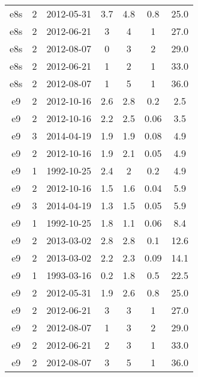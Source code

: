 \begin{table*}[htp]
\begin{tabular}{ccccccc}
e8s & 2 & 2012-05-31 & 3.7 & 4.8 & 0.8 & 25.0 \\
e8s & 2 & 2012-06-21 & 3 & 4 & 1 & 27.0 \\
e8s & 2 & 2012-08-07 & 0 & 3 & 2 & 29.0 \\
e8s & 2 & 2012-06-21 & 1 & 2 & 1 & 33.0 \\
e8s & 2 & 2012-08-07 & 1 & 5 & 1 & 36.0 \\
e9 & 2 & 2012-10-16 & 2.6 & 2.8 & 0.2 & 2.5 \\
e9 & 2 & 2012-10-16 & 2.2 & 2.5 & 0.06 & 3.5 \\
e9 & 3 & 2014-04-19 & 1.9 & 1.9 & 0.08 & 4.9 \\
e9 & 2 & 2012-10-16 & 1.9 & 2.1 & 0.05 & 4.9 \\
e9 & 1 & 1992-10-25 & 2.4 & 2 & 0.2 & 4.9 \\
e9 & 2 & 2012-10-16 & 1.5 & 1.6 & 0.04 & 5.9 \\
e9 & 3 & 2014-04-19 & 1.3 & 1.5 & 0.05 & 5.9 \\
e9 & 1 & 1992-10-25 & 1.8 & 1.1 & 0.06 & 8.4 \\
e9 & 2 & 2013-03-02 & 2.8 & 2.8 & 0.1 & 12.6 \\
e9 & 2 & 2013-03-02 & 2.2 & 2.3 & 0.09 & 14.1 \\
e9 & 1 & 1993-03-16 & 0.2 & 1.8 & 0.5 & 22.5 \\
e9 & 2 & 2012-05-31 & 1.9 & 2.6 & 0.8 & 25.0 \\
e9 & 2 & 2012-06-21 & 3 & 3 & 1 & 27.0 \\
e9 & 2 & 2012-08-07 & 1 & 3 & 2 & 29.0 \\
e9 & 2 & 2012-06-21 & 2 & 3 & 1 & 33.0 \\
e9 & 2 & 2012-08-07 & 3 & 5 & 1 & 36.0 \\
\hline
\end{tabular}

\end{table*}
